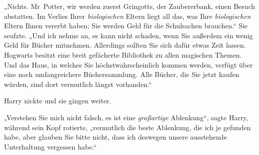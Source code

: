„Nichts. Mr~Potter, wir werden zuerst Gringotts, der Zaubererbank, einen Besuch abstatten. Im Verlies Ihrer \emph{biologischen} Eltern liegt all das, was Ihre \emph{biologischen} Eltern Ihnen vererbt haben; Sie werden Geld für die Schulsachen brauchen.“ Sie seufzte. „Und ich nehme an, es kann nicht schaden, wenn Sie außerdem ein wenig Geld für Bücher mitnehmen. Allerdings sollten Sie sich dafür etwas Zeit lassen. Hogwarts besitzt eine breit gefächerte Bibliothek zu allen magischen Themen. Und das Haus, in welches Sie höchstwahrscheinlich kommen werden, verfügt über eine noch umfangreichere Büchersammlung. Alle Bücher, die Sie jetzt kaufen würden, sind dort vermutlich längst vorhanden.“

Harry nickte und sie gingen weiter.

„Verstehen Sie mich nicht falsch, es ist eine \emph{großartige} Ablenkung“, sagte Harry, während sein Kopf rotierte, „vermutlich die beste Ablenkung, die ich je gefunden habe, aber glauben Sie bitte nicht, dass ich deswegen unsere ausstehende Unterhaltung vergessen habe.“

